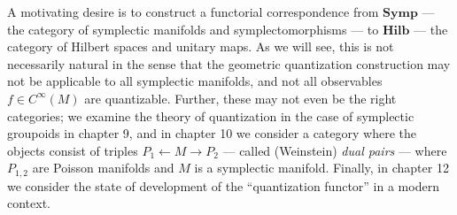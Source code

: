A motivating desire is to construct a functorial correspondence from $\mathbf{Symp}$ --- the category of symplectic manifolds and symplectomorphisms --- to $\mathbf{Hilb}$ --- the category of Hilbert spaces and unitary maps. As we will see, this is not necessarily natural in the sense that the geometric quantization construction may not be applicable to all symplectic manifolds, and not all observables $f \in C^\infty(M)$ are quantizable. Further, these may not even be the right categories; we examine the theory of quantization in the case of symplectic groupoids in chapter 9, and in chapter 10 we consider a category where the objects consist of triples $P_1 \leftarrow M \to P_2$ --- called (Weinstein) \emph{dual pairs} --- where $P_{1,2}$ are Poisson manifolds and $M$ is a symplectic manifold. Finally, in chapter 12 we consider the state of development of the ``quantization functor'' in a modern context.

